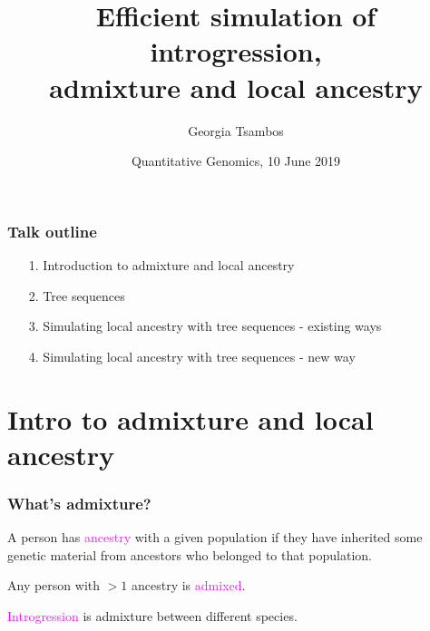 \documentclass[11pt, mathserif, aspectratio=169]{beamer}
\title{Efficient simulation of introgression,\\ admixture and local ancestry}
\author{Georgia Tsambos}
\institute{{\normalsize Melbourne Integrative Genomics, Australia}}
\date{Quantitative Genomics, 10 June 2019}
\newcommand{\magenta}[1]{\textcolor{magenta}{#1}}
\newenvironment{wideitemize}{\itemize\addtolength{\itemsep}{10pt}}{\enditemize}
\begin{document}
\maketitle

\begin{frame}
\frametitle{Talk outline}

\begin{enumerate}
\itemsep7mm
\item[1. ] Introduction to admixture and local ancestry
\item[2. ] Tree sequences
\item[3. ] Simulating local ancestry with tree sequences - existing ways
\item[4. ] Simulating local ancestry with tree sequences - new way
\end{enumerate}
\end{frame}

\section{Intro to admixture and local ancestry}


\begin{frame}
\frametitle{What's admixture?}
%

\begin{wideitemize}
    \item A person has \magenta{ancestry} with a given population if they have inherited some genetic material from ancestors who belonged to that population. 
    \item Any person with $>1$ ancestry is \magenta{admixed}.
    \item \magenta{Introgression} is admixture between different species.
\end{wideitemize}

\end{frame}
\end{document}
